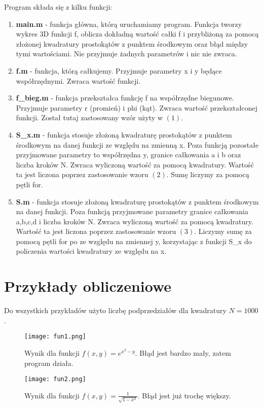 \documentclass[12pt]{article}
\begin{document}
Program składa się z kilku funkcji:
\begin{enumerate}
\item \textbf{main.m} - funkcja główna, którą uruchamiamy program. Funkcja tworzy wykres 3D funkcji f, oblicza dokładną wartość całki f i przybliżoną za pomocą złożonej kwadratury prostokątów z punktem środkowym oraz błąd między tymi wartościami. Nie przyjmuje żadnych parametrów i nic nie zwraca.
\item \textbf{f.m} - funkcja, którą całkujemy. Przyjmuje parametry x i y będące współrzędnymi. Zwraca wartość funkcji.
\item \textbf{f\_bieg.m} - funkcja przekształca funkcję f na współrzędne biegunowe. Przyjmuje parametry r (promień) i phi (kąt). Zwraca wartość przekształconej funkcji. Został tutaj zastosowany wzór użyty w $(1)$.
\item \textbf{S\_x.m} - funkcja stosuje złożoną kwadraturę prostokątów z punktem środkowym na danej funkcji ze względu na zmienną x. Poza funkcją pozostałe przyjmowane parametry to współrzędna y, granice całkowania a i b oraz liczba kroków N. Zwraca wyliczoną wartość za pomocą kwadratury. Wartość ta jest liczona poprzez zastosowanie wzoru $(2)$. Sumę liczymy za pomocą pętli for. 
\item \textbf{S.m} - funkcja stosuje złożoną kwadraturę prostokątów z punktem środkowym na danej funkcji. Poza funkcją przyjmowane parametry granice całkowania a,b,c,d i liczba kroków N. Zwraca wyliczoną wartość za pomocą kwadratury. Wartość ta jest liczona poprzez zastosowanie wzoru $(3)$. Liczymy sumę za pomocą pętli for po ze względu na zmiennej y, korzystając z funkcji S\_x do policzenia wartości kwadratury ze względu na x.
\end{enumerate}


\vskip20pt

\section{Przyk\l ady obliczeniowe}

Do wszystkich przykładów  użyto liczbę podprzedziałów dla kwadratury $N = 1000$.

\begin{figure}[H]
    \centering
    \texttt{[image: fun1.png]}
    \caption{Wynik dla funkcji $f(x,y) = e^{x^3-y}$. Błąd jest bardzo mały, zatem program działa.}
    \label{fun1}
\end{figure}

\begin{figure}[H]
    \centering
    \texttt{[image: fun2.png]}
    \caption{Wynik dla funkcji $f(x,y) = \frac{1}{\sqrt{1-x^2}}$. Błąd jest już trochę większy.}
    \label{fun2}
\end{figure}
\end{document}
